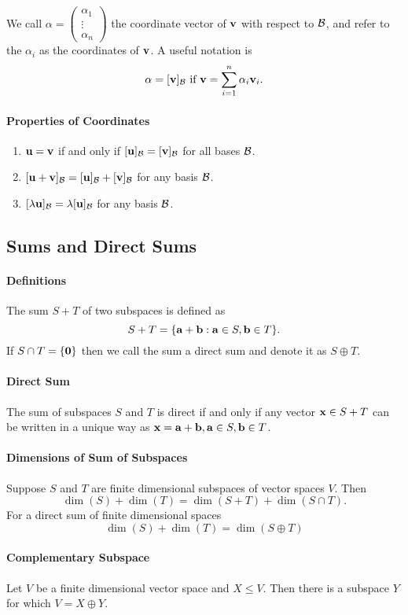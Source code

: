 We call \(\alpha = \begin{pmatrix}
    \alpha_1 \\
    \vdots \\
    \alpha_n
\end{pmatrix}\) the coordinate vector of \(\mathbf{v}\) with respect to \(\mathcal{B}\), and refer to the \(\alpha_i\) as the coordinates of \(\mathbf{v}\). A useful notation is 
\[\mathbf{\alpha} = [\mathbf{v}]_{\mathcal{B}} \text{ if } \mathbf{v} = \sum_{i=1}^n \alpha_i\mathbf{v}_i.\]

\paragraph{Properties of Coordinates}
\begin{enumerate}
    \item \(\mathbf{u} = \mathbf{v}\) if and only if \([\mathbf{u}]_{\mathcal{B}} = [\mathbf{v}]_{\mathcal{B}}\) for all bases \(\mathcal{B}\).
    \item \([\mathbf{u} + \mathbf{v}]_{\mathcal{B}} = [\mathbf{u}]_{\mathcal{B}} + [\mathbf{v}]_{\mathcal{B}}\) for any basis \(\mathcal{B}\).
    \item \([\lambda\mathbf{u}]_{\mathcal{B}} = \lambda[\mathbf{u}]_{\mathcal{B}}\) for any basis \(\mathcal{B}\).
\end{enumerate}

\subsection{Sums and Direct Sums}
\paragraph{Definitions}
The sum \(S + T\) of two subspaces is defined as 
\[S + T = \{\mathbf{a} + \mathbf{b} : \mathbf{a} \in S, \mathbf{b} \in T \}.\]
If \(S \cap T = \{\mathbf{0}\}\) then we call the sum a direct sum and denote it as \(S \oplus T\). 

\paragraph{Direct Sum}
The sum of subspaces \(S\) and \(T\) is direct if and only if any vector \(\mathbf{x} \in S + T\) can be written in a unique way as \(\mathbf{x} = \mathbf{a} + \mathbf{b}, \mathbf{a} \in S, \mathbf{b} \in T\).

\paragraph{Dimensions of Sum of Subspaces}
Suppose \(S\) and \(T\) are finite dimensional subspaces of vector spaces \(V\). Then 
\[\dim(S) + \dim(T) = \dim(S + T) + \dim(S \cap T).\]
For a direct sum of finite dimensional spaces
\[\dim(S) + \dim(T) = \dim(S \oplus T)\]

\paragraph{Complementary Subspace}
Let \(V\) be a finite dimensional vector space and \(X \leq V\). Then there is a subspace \(Y\) for which \(V = X \oplus Y\).